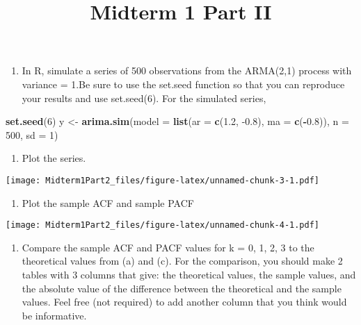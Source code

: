 \documentclass[
]{article}
\title{Midterm 1 Part II}
\author{}
\date{\vspace{-2.5em}}
\newenvironment{Shaded}{\begin{snugshade}}{\end{snugshade}}
\newcommand{\DataTypeTok}[1]{\textcolor[rgb]{0.13,0.29,0.53}{#1}}
\newcommand{\DecValTok}[1]{\textcolor[rgb]{0.00,0.00,0.81}{#1}}
\newcommand{\FloatTok}[1]{\textcolor[rgb]{0.00,0.00,0.81}{#1}}
\newcommand{\KeywordTok}[1]{\textcolor[rgb]{0.13,0.29,0.53}{\textbf{#1}}}
\newcommand{\NormalTok}[1]{#1}
\newcommand{\OperatorTok}[1]{\textcolor[rgb]{0.81,0.36,0.00}{\textbf{#1}}}
\newcommand{\StringTok}[1]{\textcolor[rgb]{0.31,0.60,0.02}{#1}}
\providecommand{\tightlist}{%
  \setlength{\itemsep}{0pt}\setlength{\parskip}{0pt}}
\begin{document}
\maketitle

\begin{enumerate}
\def\labelenumi{(\alph{enumi})}
\setcounter{enumi}{4}
\tightlist
\item
  In R, simulate a series of 500 observations from the ARMA(2,1) process
  with variance = 1.Be sure to use the set.seed function so that you can
  reproduce your results and use set.seed(6). For the simulated series,
\end{enumerate}

\begin{Shaded}
\begin{Highlighting}[]
\KeywordTok{set.seed}\NormalTok{(}\DecValTok{6}\NormalTok{)}
\NormalTok{y <-}\StringTok{ }\KeywordTok{arima.sim}\NormalTok{(}\DataTypeTok{model =} \KeywordTok{list}\NormalTok{(}\DataTypeTok{ar =} \KeywordTok{c}\NormalTok{(}\FloatTok{1.2}\NormalTok{, }\FloatTok{-0.8}\NormalTok{), }\DataTypeTok{ma =} \KeywordTok{c}\NormalTok{(}\OperatorTok{-}\FloatTok{0.8}\NormalTok{)), }\DataTypeTok{n =} \DecValTok{500}\NormalTok{, }\DataTypeTok{sd =} \DecValTok{1}\NormalTok{)}
\end{Highlighting}
\end{Shaded}

\begin{enumerate}
\def\labelenumi{(\roman{enumi})}
\tightlist
\item
  Plot the series.
\end{enumerate}

\texttt{[image: Midterm1Part2\_files/figure-latex/unnamed-chunk-3-1.pdf]}

\begin{enumerate}
\def\labelenumi{(\roman{enumi})}
\setcounter{enumi}{1}
\tightlist
\item
  Plot the sample ACF and sample PACF
\end{enumerate}

\texttt{[image: Midterm1Part2\_files/figure-latex/unnamed-chunk-4-1.pdf]}

\begin{enumerate}
\def\labelenumi{(\roman{enumi})}
\setcounter{enumi}{2}
\tightlist
\item
  Compare the sample ACF and PACF values for k = 0, 1, 2, 3 to the
  theoretical values from (a) and (c). For the comparison, you should
  make 2 tables with 3 columns that give: the theoretical values, the
  sample values, and the absolute value of the difference between the
  theoretical and the sample values. Feel free (not required) to add
  another column that you think would be informative.
\end{enumerate}
\end{document}

